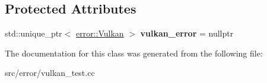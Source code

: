 \subsection*{Protected Attributes}
\begin{DoxyCompactItemize}
\item 
\hypertarget{class_error_vulkan_test_a2413e0ba8b4ef1f1d872554142f24fab}{}\label{class_error_vulkan_test_a2413e0ba8b4ef1f1d872554142f24fab} 
std\+::unique\+\_\+ptr$<$ \hyperlink{classae_1_1error_1_1_vulkan}{error\+::\+Vulkan} $>$ {\bfseries vulkan\+\_\+error} = nullptr
\end{DoxyCompactItemize}


The documentation for this class was generated from the following file\+:\begin{DoxyCompactItemize}
\item 
src/error/vulkan\+\_\+test.\+cc\end{DoxyCompactItemize}
